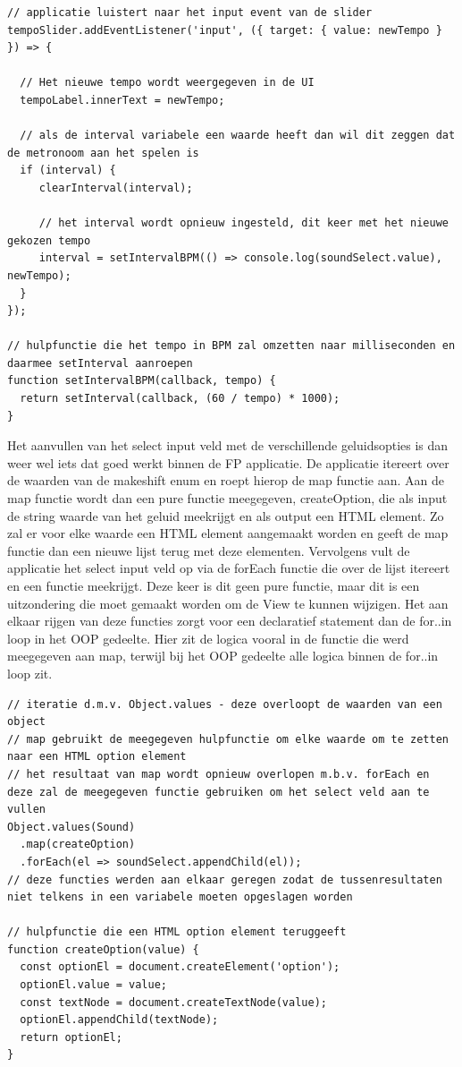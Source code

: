  \begin{lstlisting}[caption=Afhandelen van een event - FP]
// applicatie luistert naar het input event van de slider
tempoSlider.addEventListener('input', ({ target: { value: newTempo } }) => {

  // Het nieuwe tempo wordt weergegeven in de UI
  tempoLabel.innerText = newTempo;

  // als de interval variabele een waarde heeft dan wil dit zeggen dat de metronoom aan het spelen is
  if (interval) {
     clearInterval(interval);

     // het interval wordt opnieuw ingesteld, dit keer met het nieuwe gekozen tempo
     interval = setIntervalBPM(() => console.log(soundSelect.value), newTempo); 
  }
});

// hulpfunctie die het tempo in BPM zal omzetten naar milliseconden en daarmee setInterval aanroepen
function setIntervalBPM(callback, tempo) {
  return setInterval(callback, (60 / tempo) * 1000);
}
 \end{lstlisting}
 
 Het aanvullen van het select input veld met de verschillende geluidsopties is dan weer wel iets dat goed werkt binnen de FP applicatie. De applicatie itereert over de waarden van de makeshift enum en roept hierop de map functie aan. Aan de map functie wordt dan een pure functie meegegeven, createOption, die als input de string waarde van het geluid meekrijgt en als output een HTML element. Zo zal er voor elke waarde een HTML element aangemaakt worden en geeft de map functie dan een nieuwe lijst terug met deze elementen. Vervolgens vult de applicatie het select input veld op via de forEach functie die over de lijst itereert en een functie meekrijgt. Deze keer is dit geen pure functie, maar dit is een uitzondering die moet gemaakt worden om de View te kunnen wijzigen. Het aan elkaar rijgen van deze functies zorgt voor een declaratief statement dan de for..in loop in het OOP gedeelte. Hier zit de logica vooral in de functie die werd meegegeven aan map, terwijl bij het OOP gedeelte alle logica binnen de for..in loop zit.

 \begin{lstlisting}[caption=Opvullen van het select veld - FP]
// iteratie d.m.v. Object.values - deze overloopt de waarden van een object
// map gebruikt de meegegeven hulpfunctie om elke waarde om te zetten naar een HTML option element
// het resultaat van map wordt opnieuw overlopen m.b.v. forEach en deze zal de meegegeven functie gebruiken om het select veld aan te vullen
Object.values(Sound)
  .map(createOption)
  .forEach(el => soundSelect.appendChild(el));
// deze functies werden aan elkaar geregen zodat de tussenresultaten niet telkens in een variabele moeten opgeslagen worden

// hulpfunctie die een HTML option element teruggeeft
function createOption(value) {
  const optionEl = document.createElement('option');
  optionEl.value = value;
  const textNode = document.createTextNode(value);
  optionEl.appendChild(textNode);
  return optionEl;
}
 \end{lstlisting}

